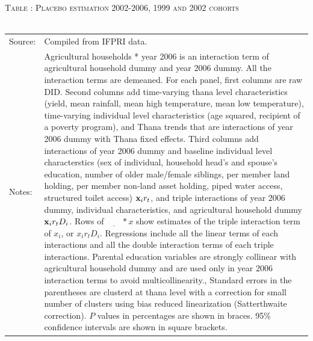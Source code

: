 \documentclass[12pt,letterpaper]{article}\usepackage[margin=1in]{geometry}
\newcommand{\bfx}{\ensuremath{\mbox{\bf x}}}
\newcommand{\0}{\ensuremath{\mbox{\boldmath $0$}}}
\begin{document}
\begin{table}\hfil\textsc{\footnotesize Table \thetable: Placebo estimation 2002-2006, 1999 and 2002 cohorts\label{Placebo10}}\\\setlength{\tabcolsep}{.5pt}\renewcommand{\arraystretch}{.675}\hspace{-2em}\hfil\\
\renewcommand{\arraystretch}{1}
\hfil\begin{tabular}{>{\hfill\scriptsize}p{1cm}<{}>{\scriptsize}p{12cm}<{\hfill}} 
Source:& Compiled from IFPRI data. \\[-1ex]
Notes:&   \textsf{Agricultural households * year 2006} is an interaction term of agricultural household dummy and year 2006 dummy. All the interaction terms are demeaned. For each panel, first columns are raw DID. Second columns add time-varying thana level characteristics (yield, mean rainfall, mean high temperature, mean low temperature), time-varying individual level characteristics (age squared, recipient of a poverty program), and \textsf{Thana trends} that are interactions of year 2006 dummy with Thana fixed effects. Third columns add interactions of year 2006 dummy and baseline individual level characterstics (sex of individual, household head's and spouse's education, number of older male/female siblings, per member land holding, per member non-land asset holding, piped water access, structured toilet access) $\bfx_{i}r_{t}$, and triple interactions of year 2006 dummy, individual characteristics, and agricultural household dummy $\bfx_{i}r_{t}D_{i}$.  Rows of $\underline{\phantom{mm}}*x$ show estimates of the triple interaction term of $x_{i}$, or $x_{i}r_{t}D_{i}$. Regressions include all the linear terms of each interactions and all the double interaction terms of each triple interactions. Parental education variables are strongly collinear with agricultural household dummy and are used only in year 2006 interaction terms to avoid multicollinearity.,  Standard errors in the parentheses are clusterd at thana level with a correction for small number of clusters using bias reduced linearization (Satterthwaite correction). $P$ values in percentages are shown in braces. 95\% confidence intervals are shown in square brackets.  
\end{tabular} \end{table}
\end{document}
